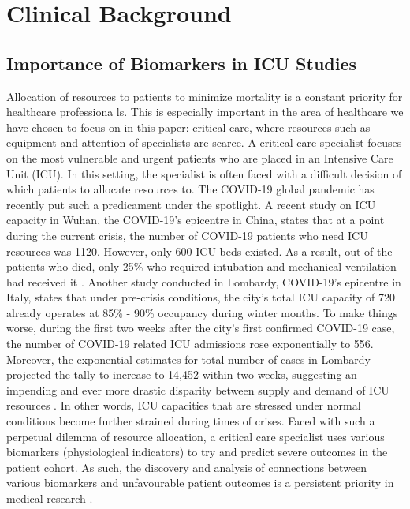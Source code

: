 
\chapter{Clinical Background} %

\label{chapter1} %


\section{Importance of Biomarkers in ICU Studies}

Allocation of resources to patients to minimize mortality is a constant priority for healthcare professiona ls. This is especially important in the area of healthcare we have chosen to focus on in this paper: critical care,  where resources such as equipment and attention of specialists are  scarce. A critical care specialist focuses on the most vulnerable and urgent patients who are placed in an Intensive Care Unit (ICU). In this setting, the specialist is often faced with a difficult decision of which patients to allocate resources to.
The COVID-19 global pandemic has recently put such a predicament under the spotlight. A recent study on ICU capacity in Wuhan, the COVID-19's epicentre in China, states that at a point during the current crisis, the number of COVID-19 patients who need ICU resources was 1120. However, only 600 ICU beds existed. As a result, out of the patients who died, only 25\% who required intubation and mechanical ventilation had received it \citep{wu2020characteristics}. Another study conducted in Lombardy, COVID-19's epicentre in Italy, states that under pre-crisis conditions,  the city's  total ICU capacity of 720 already operates at 85\% - 90\% occupancy during winter months. To make things worse, during the first two weeks after the city's first confirmed COVID-19 case, the number of COVID-19 related ICU admissions rose exponentially to 556. Moreover, the exponential estimates for total number of cases in Lombardy projected the tally to increase to 14,452 within two weeks, suggesting an impending and ever more drastic disparity between supply and demand of ICU resources \citep{grasselli2020}. In other words, ICU capacities that are stressed under normal conditions become further strained during times of crises. Faced with such a perpetual dilemma of resource allocation, a critical care specialist uses various biomarkers (physiological indicators) to try and predict severe outcomes in the patient cohort. As such, the discovery and analysis of connections between various biomarkers and unfavourable patient outcomes is a persistent priority in medical research \citep{ware2017biomarkers}. 

